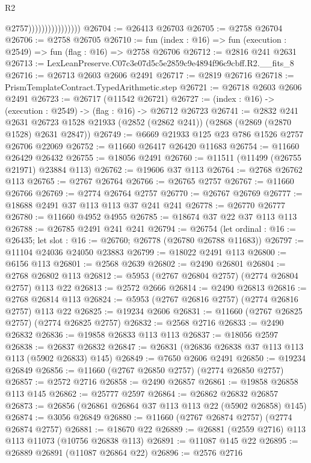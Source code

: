 \begin{lexlean}{R2}
\begin{coremodule}
                                    @2757))))))))))))))))
@26704 := @26413 @26703
@26705 := @2758 @26704
@26706 := @2758 @26705
@26710 := fun (index : @16) => fun (execution : @2549) => fun (flag : @16) => @2758 @26706
@26712 := @2816 @241 @2631
@26713 := LexLeanPreserve.C07c3e07d5c5e2859c9e4894f96c9cbff.R2.__fits_8
@26716 := @26713 @2603 @2606 @2491
@26717 := @2819 @26716
@26718 := PrismTemplateContract.TypedArithmetic.step
@26721 := @26718 @2603 @2606 @2491
@26723 := @26717 (@11542 @26721)
@26727 := (index : @16) -> (execution : @2549) -> (flag : @16) -> @26712 @26723
@26741 := @2832
    @241
    @2631
    @26723
    @1528
    @21933
    (@2852 (@2862 @241))
    (@2868 (@2869 (@2870 @1528) @2631 @2847))
@26749 := @6669 @21933 @125 @23 @786 @1526 @2757 @26706 @22069
@26752 := @11660 @26417 @26420 @11683
@26754 := @11660 @26429 @26432
@26755 := @18056 @2491
@26760 := @11511 (@11499 (@26755 @21971) @23884 @113)
@26762 := @19606 @37 @113
@26764 := @2768 @26762 @113
@26765 := @2767 @26764
@26766 := @26765 @2757
@26767 := @11660 @26766
@26769 := @2774 @26764 @2757
@26770 := @26767 @26769
@26777 := @18688 @2491 @37 @113 @113 @37 @241 @241
@26778 := @26770 @26777
@26780 := @11660 @4952 @4955
@26785 := @18674 @37 @22 @37 @113 @113
@26788 := @26785 @2491 @241 @241
@26794 := @26754
    (let ordinal : @16 := @26435; let slot : @16 := @26760; @26778 (@26780 @26788 @11683))
@26797 := @11104 @24036 @24050 @23883
@26799 := @18022 @2491 @113
@26800 := @6156 @113
@26801 := @2568 @2639
@26802 := @2490 @26801
@26804 := @2768 @26802 @113
@26812 := @5953 (@2767 @26804 @2757) (@2774 @26804 @2757) @113 @22
@26813 := @2572 @2666
@26814 := @2490 @26813
@26816 := @2768 @26814 @113
@26824 := @5953 (@2767 @26816 @2757) (@2774 @26816 @2757) @113 @22
@26825 := @19234 @2606
@26831 := @11660 (@2767 @26825 @2757) (@2774 @26825 @2757)
@26832 := @2568 @2716
@26833 := @2490 @26832
@26836 := @19858 @26833 @113 @113
@26837 := @18056 @2597
@26838 := @26837 @26832
@26847 := @26831 (@26836 @26838 @37 @113 @113 @113 (@5902 @26833) @145)
@26849 := @7650 @2606 @2491
@26850 := @19234 @26849
@26856 := @11660 (@2767 @26850 @2757) (@2774 @26850 @2757)
@26857 := @2572 @2716
@26858 := @2490 @26857
@26861 := @19858 @26858 @113 @145
@26862 := @25777 @2597
@26864 := @26862 @26832 @26857
@26873 := @26856 (@26861 @26864 @37 @113 @113 @22 (@5902 @26858) @145)
@26874 := @3056 @26849
@26880 := @11660 (@2767 @26874 @2757) (@2774 @26874 @2757)
@26881 := @18670 @22
@26889 := @26881 (@2559 @2716) @113 @113 @11073 (@10756 @26838 @113)
@26891 := @11087 @145 @22
@26895 := @26889 @26891 (@11087 @26864 @22)
@26896 := @2576 @2716

\end{coremodule}
\end{lexlean}

